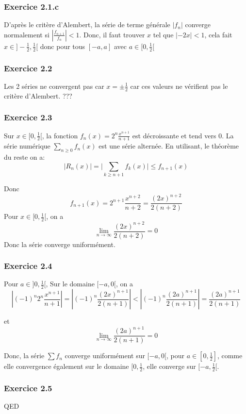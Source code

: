 \documentclass[]{book}
\theoremstyle{definition}
\begin{document}
\subsubsection*{Exercice 2.1.c}
D'apr\`es le crit\`ere d'Alembert, la s\'erie de terme g\'en\'erale $\lvert f_n \rvert$ converge normalement si $\left\lvert \frac{f_{n+1}}{f_n} \right\rvert < 1$. Donc, il faut trouver $x$ tel que  $\lvert -2x \rvert < 1$, cela fait $x \in ]-\frac{1}{2}, \frac{1}{2}[$ donc pour tous $[-a,a]$ avec $a \in [0,\frac{1}{2}[$


\subsubsection*{Exercice 2.2}
Les 2 s\'eries ne convergent pas car $x=\pm \frac{1}{2}$ car ces valeurs ne v\'erifient pas le crit\`ere d'Alembert. ???


\subsubsection*{Exercice 2.3}
Sur $x \in [0,\frac{1}{2}[$, la fonction $f_n(x) = 2^n\frac{x^{n+1}}{n+1}$ est d\'ecroissante et tend vers 0. La s\'erie num\'erique $\sum_{n \ge 0} f_n(x)$ est une s\'erie altern\'ee. En utilisant, le th\'eor\`eme du reste on a:
$$\lvert R_n(x) \rvert = \lvert \sum_{k \ge n+1}f_k(x) \rvert \le f_{n+1}(x)$$

Donc
$$
f_{n+1}(x) = 2^{n+1}\frac{x^{n+2}}{n+2} = \frac{(2x)^{n+2}}{2(n+2)}
$$
Pour $x \in [0,\frac{1}{2}[$, on a
$$\lim_{n \to \infty} \frac{(2x)^{n+2}}{2(n+2)} = 0$$
Donc la s\'erie converge uniform\'ement.

\subsubsection*{Exercice 2.4}
Pour $a \in ]0,\frac{1}{2}[$, Sur le domaine $[-a,0[$, on a
$$
|(-1)^n2^n\frac{x^{n+1}}{n+1}| = |(-1)^n\frac{(2x)^{n+1}}{2(n+1)}| < |(-1)^n\frac{(2a)^{n+1}}{2(n+1)}| = \frac{(2a)^{n+1}}{2(n+1)}
$$

et 
$$
\lim_{n \to \infty} \frac{(2a)^{n+1}}{2(n+1)} = 0
$$

Donc, la s\'erie $\sum f_n$ converge uniform\'ement sur $[-a,0[$, pour $a \in [0,\frac{1}{2}]$, comme elle convergence \'egalement sur le domaine $[0,\frac{1}{2}$, elle converge sur $[-a, \frac{1}{2}[$.

\subsubsection*{Exercice 2.5}

 
QED
\end{document}
